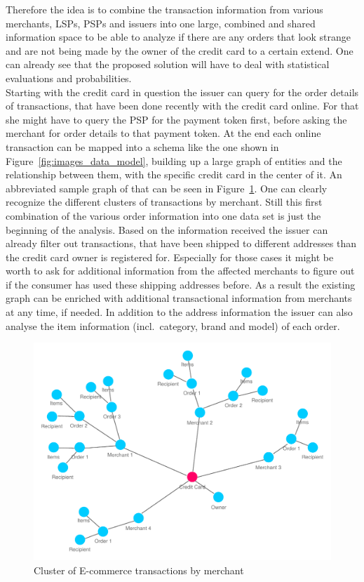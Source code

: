 Therefore the idea is to combine the transaction information from various merchants, \gls{LSP}s, \gls{PSP}s and issuers into one large, combined and shared information space to be able to analyze if there are any orders that look strange and are not being made by the owner of the credit card to a certain extend. One can already see that the proposed solution will have to deal with statistical evaluations and probabilities. \\

Starting with the credit card in question the issuer can query for the order details of transactions, that have been done recently with the credit card online. For that she might have to query the \gls{PSP} for the payment token first, before asking the merchant for order details to that payment token. At the end each online transaction can be mapped into a schema like the one shown in Figure~\ref{fig:images_data_model}, building up a large graph of entities and  the relationship between them, with the specific credit card in the center of it. An abbreviated sample graph of that can be seen in Figure~\ref{fig:images_credit_card_graph}. One can clearly recognize the different clusters of transactions by merchant. Still this first combination of the various order information into one data set is just the beginning of the analysis. Based on the information received the issuer can already filter out transactions, that have been shipped to different addresses than the credit card owner is registered for. Especially for those cases it might be worth to ask for additional information from the affected merchants to figure out if the consumer has used these shipping addresses before. As a result the existing graph can be enriched with additional transactional information from merchants at any time, if needed. In addition to the address information the issuer can also analyse the item information (incl.\ category, brand and model) of each order. \\

\begin{figure}[!ht]
  \centering
  \includegraphics[width=0.9\columnwidth]{images/ontology_scenario_2.pdf}
  \caption{Cluster of E-commerce transactions by merchant}
\label{fig:images_credit_card_graph}
\end{figure}

